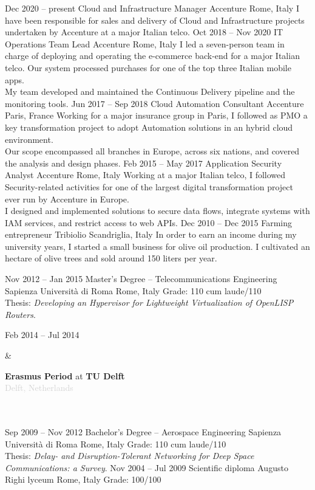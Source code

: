\documentclass[9pt]{developercv}
\begin{document}
\begin{entrylist}
	\entry
		{Dec 2020 -- present}
		{Cloud and Infrastructure Manager}
		{Accenture}
		{Rome, Italy}
		{
			I have been responsible for sales and delivery of Cloud and Infrastructure projects undertaken by Accenture at a major Italian telco.
		}
	\entry
		{Oct 2018 -- Nov 2020}
		{IT Operations Team Lead}
		{Accenture}
		{Rome, Italy}
		{
			I led a seven-person team in charge of deploying and operating the e-commerce back-end for a major Italian telco. Our system processed purchases for one of the top three Italian mobile apps.
			\\
			My team developed and maintained the Continuous Delivery pipeline and the monitoring tools.
		}
	\entry
		{Jun 2017 -- Sep 2018}
		{Cloud Automation Consultant}
		{Accenture}
		{Paris, France}
		{
			Working for a major insurance group in Paris, I followed as PMO a key transformation project to adopt Automation solutions in an hybrid cloud environment.
			\\
			Our scope encompassed all branches in Europe, across six nations, and covered the analysis and design phases.
		}
	\entry
		{Feb 2015 -- May 2017}
		{Application Security Analyst}
		{Accenture}
		{Rome, Italy}
		{
			Working at a major Italian telco, I followed Security-related activities for one of the largest digital transformation project ever run by Accenture in Europe.
			\\
			I designed and implemented solutions to secure data flows, integrate systems with IAM services, and restrict access to web APIs.
		}
	\entry
		{Dec 2010 -- Dec 2015}
		{Farming entrepreneur}
		{Tribiolio}
		{Scandriglia, Italy}
		{
			In order to earn an income during my university years, I started a small business for olive oil production. I cultivated an hectare of olive trees and sold around 150 liters per year.
		}
\end{entrylist}


\begin{entrylist}
	\entry
		{Nov 2012 -- Jan 2015}
		{Master’s Degree -- Telecommunications Engineering}
		{Sapienza Università di Roma}
		{Rome, Italy}
		{
			Grade: 110 cum laude/110
			\\
			Thesis: \textit{Developing an Hypervisor for Lightweight Virtualization of OpenLISP Routers}.
		}
		\parbox[t]{0.2\textwidth}{
			Feb 2014 -- Jul 2014
		}
		&\parbox[t]{0.8\textwidth}{
			\textbf{Erasmus Period} at \textbf{TU Delft}
			\\
			\textcolor{lightgrey}{Delft, Netherlands}
		}\\\\
	\entry
		{Sep 2009 -- Nov 2012}
		{Bachelor’s Degree -- Aerospace Engineering}
		{Sapienza Università di Roma}
		{Rome, Italy}
		{
			Grade: 110 cum laude/110
			\\
			Thesis: \textit{Delay- and Disruption-Tolerant Networking for Deep Space Communications: a Survey}.
		}
	\entry
		{Nov 2004 -- Jul 2009}
		{Scientific diploma}
		{Augusto Righi lyceum}
		{Rome, Italy}
		{Grade: 100/100}
\end{entrylist}
\end{document}
